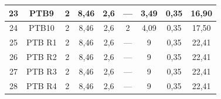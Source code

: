 \documentclass[	DIV=calc,%
							paper=a4,%
							fontsize=12pt,%
							onecolumn]{scrartcl}	 					%
\begin{document}
{\begin{tabular}{|c|c|c|c|c|c|c|c|c|}
	23                 & PTB9               & 2                                                    & 8,46                                        & 2,6                                           & ---                                           & 3,49                                             & 0,35                                            & 16,90                                                             \\ \hline
	24                 & PTB10              & 2                                                    & 8,46                                        & 2,6                                           & 2                                             & 4,09                                             & 0,35                                            & 17,50                                                             \\ \hline
	25                 & PTB R1             & 2                                                    & 8,46                                        & 2,6                                           & ---                                           & 9                                                & 0,35                                            & 22,41                                                             \\ \hline
	26                 & PTB R2             & 2                                                    & 8,46                                        & 2,6                                           & ---                                           & 9                                                & 0,35                                            & 22,41                                                             \\ \hline
	27                 & PTB R3             & 2                                                    & 8,46                                        & 2,6                                           & ---                                           & 9                                                & 0,35                                            & 22,41                                                             \\ \hline
	28                 & PTB R4             & 2                                                    & 8,46                                        & 2,6                                           & ---                                           & 9                                                & 0,35                                            & 22,41                                                             \\ \hline

\end{tabular}}
\end{document}
